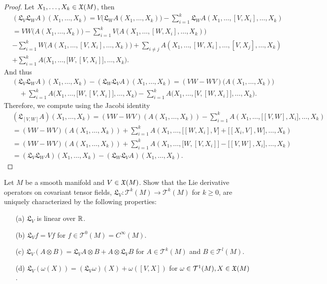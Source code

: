 \begin{proof}
Let $X_1,\dots,X_k\in\mathfrak{X}(M)$, then
\begin{align*}
&(\mathfrak{L}_V\mathfrak{L}_WA)(X_1,\dots,X_k)=V\big(\mathfrak{L}_WA(X_1,\dots,X_k)\big)-\sum_{i=1}^{k}\mathfrak{L}_WA(X_1,\dots,[V,X_i],\dots,X_k)\\
&=VW\big(A(X_1,\dots,X_k)\big)-\sum_{i=1}^{k}V\big(A(X_1,\dots,[W,X_i],\dots,X_k)\big)\\
&-\sum_{i=1}^{k}W\big(A(X_1,\dots,[V,X_i],\dots,X_k)\big)+\sum_{i\neq j}A(X_1,\dots,[W,X_i],\dots,[V,X_j],\dots,X_k)\\
&+\sum_{i=1}^{k}A\big(X_1,\dots,\big[W,[V,X_i]\big],\dots,X_k\big).
\end{align*}
And thus
\begin{align*}
&(\mathfrak{L}_V\mathfrak{L}_WA)(X_1,\dots,X_k)-(\mathfrak{L}_W\mathfrak{L}_VA)(X_1,\dots,X_k)=(VW-WV)\big(A(X_1,\dots,X_k)\big)\\
&\quad+\sum_{i=1}^{k}A\big(X_1,\dots,\big[W,[V,X_i]\big],\dots,X_k\big)-\sum_{i=1}^{k}A\big(X_1,\dots,\big[V,[W,X_i]\big],\dots,X_k\big).
\end{align*}
Therefore, we compute using the Jacobi identity
\begin{align*}
&(\mathfrak{L}_{[V,W]}A)(X_1,\dots,X_k)=(VW-WV)(A(X_1,\dots,X_k))-\sum_{i=1}^{k}A(X_1,\dots,\big[[V,W],X_i\big],\dots,X_k)\\
&=(VW-WV)(A(X_1,\dots,X_k))+\sum_{i=1}^{k}A(X_1,\dots,\big[[W,X_i],V\big]+\big[[X_i,V],W\big],\dots,X_k)\\
&=(VW-WV)(A(X_1,\dots,X_k))+\sum_{i=1}^{k}A(X_1,\dots,\big[W,[V,X_i]\big]-\big[[V,W],X_i\big],\dots,X_k)\\
&=(\mathfrak{L}_V\mathfrak{L}_WA)(X_1,\dots,X_k)-(\mathfrak{L}_W\mathfrak{L}_VA)(X_1,\dots,X_k).
\end{align*}
\end{proof}
\begin{exercise}
Let $M$ be a smooth manifold and $V\in\mathfrak{X}(M)$. Show that the Lie derivative operators on covariant tensor fields, $\mathfrak{L}_V:\mathcal{T}^k(M)\to\mathcal{T}^k(M)$ for $k\geq 0$, are uniquely characterized by the following properties:
\begin{itemize}
\item[(a)] $\mathfrak{L}_V$ is linear over $\mathbb{R}$.
\item[(b)] $\mathfrak{L}_Vf=Vf$ for $f\in\mathcal{T}^0(M)=C^\infty(M)$. 
\item[(c)] $\mathfrak{L}_V(A\otimes B)=\mathfrak{L}_VA\otimes B+A\otimes\mathfrak{L}_VB$ for $A\in\mathcal{T}^k(M)$ and $B\in\mathcal{T}^l(M)$.
\item[(d)] $\mathfrak{L}_V(\omega(X))=(\mathfrak{L}_V\omega)(X)+\omega([V,X])$ for $\omega\in\mathcal{T}^1(M),X\in\mathfrak{X}(M)$.
\end{itemize}
\end{exercise}
